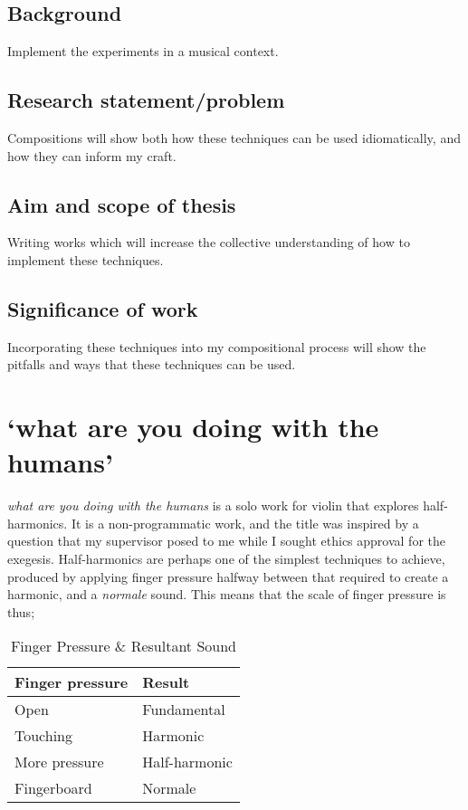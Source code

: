 \subsection{Background}
Implement the experiments in a musical context.
\subsection{Research statement/problem}
Compositions will show both how these techniques can be used idiomatically, and how they can inform my craft.
\subsection{Aim and scope of thesis}
Writing works which will increase the collective understanding of how to implement these techniques.
\subsection{Significance of work}
Incorporating these techniques into my compositional process will show the pitfalls and ways that these techniques can be used.

\section{`what are you doing with the humans'}
\emph{what are you doing with the humans} is a solo work for violin that explores half-harmonics.
It is a non-programmatic work, and the title was inspired by a question that my supervisor posed to me while I sought ethics approval for the exegesis.
Half-harmonics are perhaps one of the simplest techniques to achieve, produced by applying finger pressure halfway between that required to create a harmonic, and a \emph{normale} sound.
This means that the scale of finger pressure is thus;

\begin{table}[]
    \centering
    \caption{Finger Pressure \& Resultant Sound}
    \label{tab:finger-pressure}
    \begin{tabular}{@{}ll@{}}
    \toprule
    Finger pressure & Result        \\ \midrule
    Open            & Fundamental   \\
    Touching        & Harmonic      \\
    More pressure   & Half-harmonic \\
    Fingerboard     & Normale       \\ \bottomrule
    \end{tabular}%
    \end{table}

